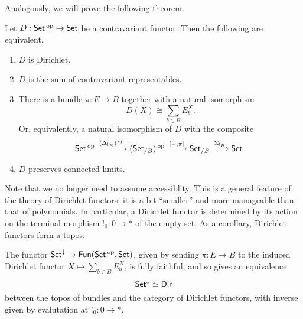 Analogously, we will prove the following theorem.
\begin{thm}
Let $D : \operatorname{\mathsf{{Set}}}\operatorname{^\textnormal{op}} \to \operatorname{\mathsf{{Set}}}$ be a contravariant functor. Then the following are
equivalent.
\begin{enumerate}
\item $D$ is Dirichlet.
\item $D$ is the sum of contravariant representables.
\item There is a bundle $\pi : E \to B$ together with a natural isomorphism
  $$D(X) \cong \sum_{b \in B} E_b^X.$$
  Or, equivalently, a natural isomorphism of $D$ with the composite
  $$\operatorname{\mathsf{{Set}}}\operatorname{^\textnormal{op}} \xrightarrow{(\Delta_{!_B})\operatorname{^\textnormal{op}}} (\operatorname{\mathsf{{Set}}}_{/B})\operatorname{^\textnormal{op}} \xrightarrow{[-, \pi]} \operatorname{\mathsf{{Set}}}_{/B}
  \xrightarrow{\Sigma_{!_B}} \operatorname{\mathsf{{Set}}}.$$
\item $D$ preserves connected limits.
\end{enumerate}
\end{thm}

Note that we no longer need to assume accessiblity. This is a general feature of
the theory of Dirichlet functors; it is a bit ``smaller'' and more manageable
than that of polynomials. In particular, a Dirichlet functor is determined by
its action on the terminal morphism $!_0 : 0 \to \ast$ of the empty set. As a corollary, Dirichlet functors form a topos.

\begin{thm}\label{thm:dirichlet.set.equivalence}
The functor $\operatorname{\mathsf{{Set}}}^{\mathbin{\downarrow}} \to \mathsf{{Fun}}(\operatorname{\mathsf{{Set}}}\operatorname{^\textnormal{op}}, \operatorname{\mathsf{{Set}}})$, given by sending $\pi : E
\to B$ to the induced Dirichlet functor $X \mapsto \sum_{b \in B} E_b^X$, is
fully faithful, and so gives an equivalence
$$\operatorname{\mathsf{{Set}}}^{\mathbin{\downarrow}} \simeq \operatorname{\mathsf{{Dir}}}$$
between the topos of bundles and the category of Dirichlet functors, with inverse given by evalutation at
$!_0 : 0 \to \ast$.
\end{thm}


